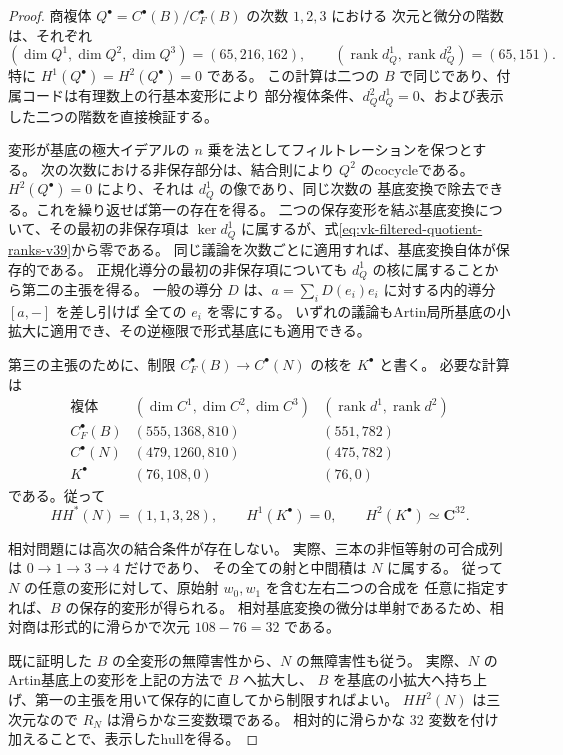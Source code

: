 \begin{proof}
商複体 $Q^\bullet=C^\bullet(B)/C_F^\bullet(B)$ の次数 $1,2,3$ における
次元と微分の階数は、それぞれ
\begin{equation}
 (\dim Q^1,\dim Q^2,\dim Q^3)=(65,216,162),\qquad
 (\operatorname{rank}d_Q^1,\operatorname{rank}d_Q^2)=(65,151).
 \label{eq:vk-filtered-quotient-ranks-v39}
\end{equation}
特に $H^1(Q^\bullet)=H^2(Q^\bullet)=0$ である。
この計算は二つの $B$ で同じであり、付属コードは有理数上の行基本変形により
部分複体条件、$d_Q^2d_Q^1=0$、および表示した二つの階数を直接検証する。

変形が基底の極大イデアルの $n$ 乗を法としてフィルトレーションを保つとする。
次の次数における非保存部分は、結合則により $Q^2$ のcocycleである。
$H^2(Q^\bullet)=0$ により、それは $d_Q^1$ の像であり、同じ次数の
基底変換で除去できる。これを繰り返せば第一の存在を得る。
二つの保存変形を結ぶ基底変換について、その最初の非保存項は
$\ker d_Q^1$ に属するが、式\eqref{eq:vk-filtered-quotient-ranks-v39}から零である。
同じ議論を次数ごとに適用すれば、基底変換自体が保存的である。
正規化導分の最初の非保存項についても $d_Q^1$ の核に属することから第二の主張を得る。
一般の導分 $D$ は、$a=\sum_iD(e_i)e_i$ に対する内的導分 $[a,-]$ を差し引けば
全ての $e_i$ を零にする。
いずれの議論もArtin局所基底の小拡大に適用でき、その逆極限で形式基底にも適用できる。

第三の主張のために、制限
$C_F^\bullet(B)\to C^\bullet(N)$ の核を $K^\bullet$ と書く。
必要な計算は
\[
\begin{array}{c|c|c}
 \text{複体}&(\dim C^1,\dim C^2,\dim C^3)
   &(\operatorname{rank}d^1,\operatorname{rank}d^2)\\\hline
 C_F^\bullet(B)&(555,1368,810)&(551,782)\\
 C^\bullet(N)&(479,1260,810)&(475,782)\\
 K^\bullet&(76,108,0)&(76,0)
\end{array}
\]
である。従って
\[
 HH^*(N)=(1,1,3,28),\qquad H^1(K^\bullet)=0,\qquad
 H^2(K^\bullet)\simeq\mathbf C^{32}.
\]

相対問題には高次の結合条件が存在しない。
実際、三本の非恒等射の可合成列は $0\to1\to3\to4$ だけであり、
その全ての射と中間積は $N$ に属する。
従って $N$ の任意の変形に対して、原始射 $w_0,w_1$ を含む左右二つの合成を
任意に指定すれば、$B$ の保存的変形が得られる。
相対基底変換の微分は単射であるため、相対商は形式的に滑らかで次元 $108-76=32$ である。

既に証明した $B$ の全変形の無障害性から、$N$ の無障害性も従う。
実際、$N$ のArtin基底上の変形を上記の方法で $B$ へ拡大し、
$B$ を基底の小拡大へ持ち上げ、第一の主張を用いて保存的に直してから制限すればよい。
$HH^2(N)$ は三次元なので $R_N$ は滑らかな三変数環である。
相対的に滑らかな $32$ 変数を付け加えることで、表示したhullを得る。
\end{proof}

